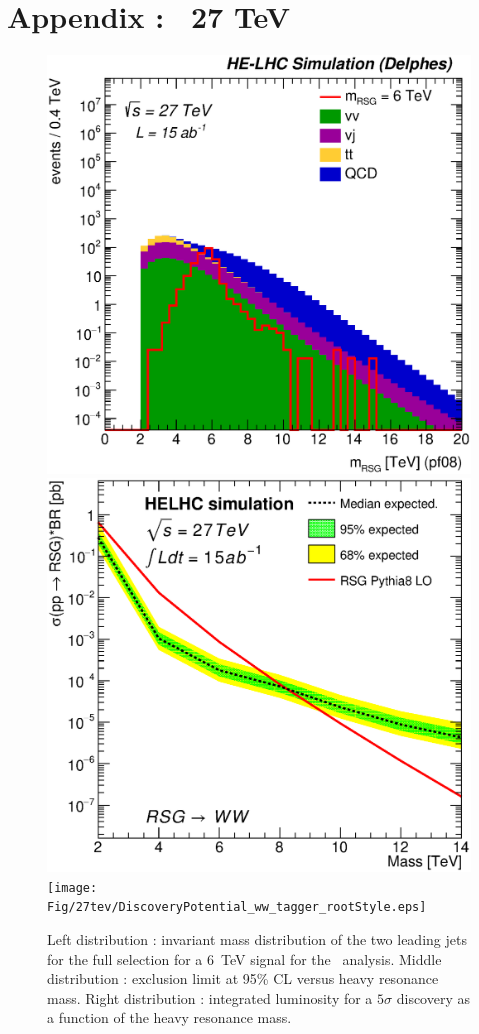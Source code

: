 \begin{table}[!htb]\centering
{}
\caption{Final yield of \zptt\ analysis.}
\label{tab:ZpttYield27}
\end{table}

\clearpage
\newpage

\section{Appendix : \rsg\ 27 TeV}
\label{appendix:rsgww27}

\begin{figure}[!htb]
  \centering
  \includegraphics[width=0.30\columnwidth]{Fig/27tev/RSGWW_Mj1j2_pf08_fit_sel4_nostack_log.eps}
  \includegraphics[width=0.30\columnwidth]{Fig/27tev/lim_RSGraviton_ww_helhc_v01.eps}
  \texttt{[image: Fig/27tev/DiscoveryPotential\_ww\_tagger\_rootStyle.eps]}
  \caption{Left distribution : invariant mass distribution of the two leading jets for the full selection for a 6~TeV signal for the \rsg\ analysis. Middle distribution : exclusion limit at 95\% CL versus heavy resonance mass. Right distribution : integrated luminosity for a $5\sigma$ discovery as a function of the heavy resonance mass.}
  \label{figure:hadronicresonances27:wwsel04}
\end{figure}

